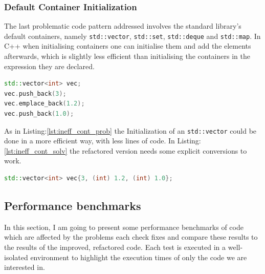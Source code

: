 \subsubsection{Default Container Initialization}
\par The last problematic code pattern addressed involves the standard library's default containers, namely \verb|std::vector|, \verb|std::set|, \verb|std::deque| and \verb|std::map|. In C++ when initialising containers one can initialise them and add the elements afterwards, which is slightly less efficient than initialising the containers in the expression they are declared. \medskip
\begin{lstlisting}[language=c++, frame=single ,caption={Inefficient way of creating containers}, label={lst:ineff_cont_prob}]
std::vector<int> vec;
vec.push_back(3);
vec.emplace_back(1.2);
vec.push_back(1.0);
\end{lstlisting}
\par As in Listing:\ref{lst:ineff_cont_prob} the Initialization of an \verb|std::vector| could be done in a more efficient way, with less lines of code. In Listing:\ref{lst:ineff_cont_solv}  the refactored version needs some explicit conversions to work.
\begin{lstlisting}[language=c++, frame=single ,caption={A faster way of initialising}, label={lst:ineff_cont_solv}]
std::vector<int> vec{3, (int) 1.2, (int) 1.0};
\end{lstlisting}
\subsection{Performance benchmarks}
\par In this section, I am going to present some performance benchmarks of code which are affected by the problems each check fixes and compare these results to the results of the improved, refactored code. Each test is executed in a well-isolated environment to highlight the execution times of only the code we are interested in.
